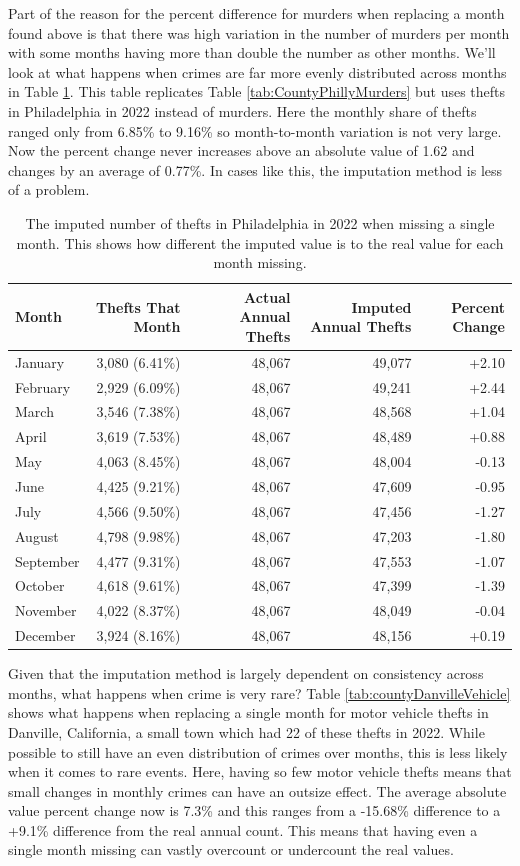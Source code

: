 \documentclass[
  12pt,
  openany]{book}
\begin{document}
Part of the reason for the percent difference for murders when replacing a month found above is that there was high variation in the number of murders per month with some months having more than double the number as other months. We'll look at what happens when crimes are far more evenly distributed across months in Table \ref{tab:countyPhillyThefts}. This table replicates Table \ref{tab:CountyPhillyMurders} but uses thefts in Philadelphia in 2022 instead of murders. Here the monthly share of thefts ranged only from 6.85\% to 9.16\% so month-to-month variation is not very large. Now the percent change never increases above an absolute value of 1.62 and changes by an average of 0.77\%. In cases like this, the imputation method is less of a problem.

\begin{longtable}[t]{lrrrr}
\caption{\label{tab:countyPhillyThefts}The imputed number of thefts in Philadelphia in 2022 when missing a single month. This shows how different the imputed value is to the real value for each month missing.}\\
\toprule
Month & Thefts That Month & Actual Annual Thefts & Imputed Annual Thefts & Percent Change\\
\midrule
January & 3,080 (6.41\%) & 48,067 & 49,077 & +2.10\\
February & 2,929 (6.09\%) & 48,067 & 49,241 & +2.44\\
March & 3,546 (7.38\%) & 48,067 & 48,568 & +1.04\\
April & 3,619 (7.53\%) & 48,067 & 48,489 & +0.88\\
May & 4,063 (8.45\%) & 48,067 & 48,004 & -0.13\\
\addlinespace
June & 4,425 (9.21\%) & 48,067 & 47,609 & -0.95\\
July & 4,566 (9.50\%) & 48,067 & 47,456 & -1.27\\
August & 4,798 (9.98\%) & 48,067 & 47,203 & -1.80\\
September & 4,477 (9.31\%) & 48,067 & 47,553 & -1.07\\
October & 4,618 (9.61\%) & 48,067 & 47,399 & -1.39\\
\addlinespace
November & 4,022 (8.37\%) & 48,067 & 48,049 & -0.04\\
December & 3,924 (8.16\%) & 48,067 & 48,156 & +0.19\\
\bottomrule
\end{longtable}

Given that the imputation method is largely dependent on consistency across months, what happens when crime is very rare? Table \ref{tab:countyDanvilleVehicle} shows what happens when replacing a single month for motor vehicle thefts in Danville, California, a small town which had 22 of these thefts in 2022. While possible to still have an even distribution of crimes over months, this is less likely when it comes to rare events. Here, having so few motor vehicle thefts means that small changes in monthly crimes can have an outsize effect. The average absolute value percent change now is 7.3\% and this ranges from a -15.68\% difference to a +9.1\% difference from the real annual count. This means that having even a single month missing can vastly overcount or undercount the real values.
\end{document}
